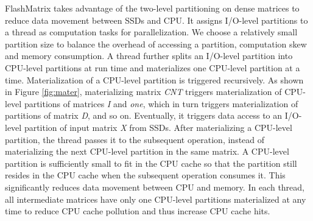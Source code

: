 FlashMatrix takes advantage of the two-level partitioning on dense matrices
to reduce data movement between SSDs and CPU. It assigns I/O-level partitions
to a thread as computation tasks for parallelization. We choose a relatively
small partition size to balance the overhead of accessing a partition,
computation skew and memory consumption. A thread further splits
an I/O-level partition into CPU-level partitions at run time and materializes
one CPU-level partition at a time. Materialization of a CPU-level partition
is triggered recursively. As shown in Figure \ref{fig:mater}, materializing
matrix \textit{CNT} triggers materialization of CPU-level partitions of matrices
\textit{I} and \textit{one}, which in turn triggers materialization of
partitions of matrix \textit{D}, and so on. Eventually, it triggers data access
to an I/O-level partition of input matrix \textit{X} from SSDs.
After materializing a CPU-level partition, the thread passes it to the subsequent
operation, instead of materializing the next CPU-level partition in the same matrix.
A CPU-level partition is sufficiently small to fit in the CPU cache so that
the partition still resides in the CPU cache when the subsequent operation consumes
it. This significantly reduces data movement between CPU and memory. In each
thread, all intermediate matrices have only one CPU-level partitions materialized
at any time to reduce CPU cache pollution and thus increase CPU cache hits.





